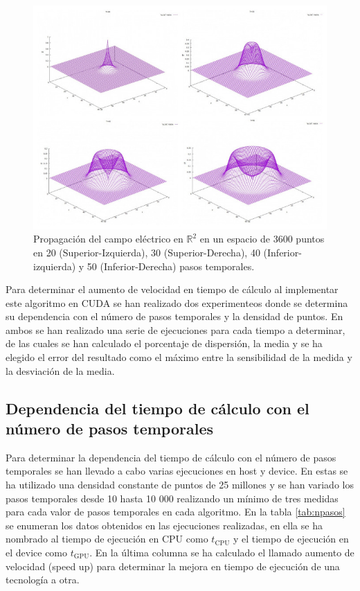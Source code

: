 \documentclass[11pt,a4paper,twoside,pdf]{article}
\numberwithin{equation}{section}
\begin{document}
\begin{figure}[ht]
\centering
\includegraphics[width=15 cm]{Solution.JPG}				
\caption{Propagación del campo eléctrico en $\mathbb R^{2}$ en un espacio de 3600 puntos en 20 (Superior-Izquierda), 30 (Superior-Derecha), 40 (Inferior-izquierda) y 50 (Inferior-Derecha) pasos temporales.}
\label{fig:solucion}
\end{figure}
\noindent

Para determinar el aumento de velocidad en tiempo de cálculo al implementar este algoritmo en CUDA se han realizado dos experimenteos donde se determina su dependencia con el número de pasos temporales y la densidad de puntos. En ambos se han realizado una serie de ejecuciones para cada tiempo a determinar, de las cuales se han calculado el porcentaje de dispersión, la media y se ha elegido el error del resultado como el máximo entre la sensibilidad de la medida y la desviación de la media.

\subsection{Dependencia del tiempo de cálculo con el número de pasos temporales} \label{Subsection:Variacion pasos temporales}

Para determinar la dependencia del tiempo de cálculo con el número de pasos temporales se han llevado a cabo varias ejecuciones en host y device. En estas se ha utilizado una densidad constante de puntos de 25 millones y se han variado los pasos temporales desde 10 hasta 10 000 realizando un mínimo de tres medidas para cada valor de pasos temporales en cada algoritmo. En la tabla  \ref{tab:npasos} se enumeran los datos obtenidos en las ejecuciones realizadas, en ella se ha nombrado al tiempo de ejecución en CPU como $t_\text{CPU}$ y el tiempo de ejecución en el device como $t_\text{GPU}$. En la última columna se ha calculado el llamado aumento de velocidad (speed up) para determinar la mejora en tiempo de ejecución de una tecnología a otra.
\end{document}
